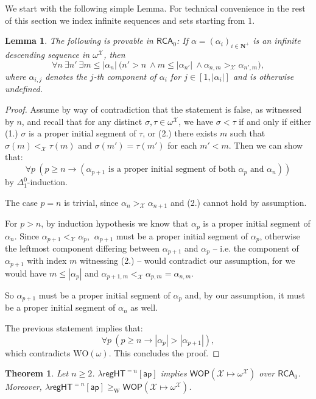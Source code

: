 \documentclass[a4paper,11pt]{article}
\newtheorem{theorem}{Theorem}
\newtheorem{lemma}{Lemma}
\newcommand\Nat{\mathbf{N}}
\newcommand\RCA{\mathsf{RCA}}
\newcommand\regHT{\mathsf{regHT}}
\newcommand\W{\mathrm{W}}
\newcommand\ap{\mathsf{ap}}
\newcommand\WO{\mathrm{WO}}
\newcommand\ordX{\mathcal{X}}
\newcommand\WOP{\mathsf{WOP}}
\begin{document}
We start with the following simple Lemma. For technical convenience in the rest of this section we index infinite sequences and sets starting from $1$.

\begin{lemma}\label{claim1} The following is provable in $\RCA_0$: If $\alpha=(\alpha_i)_{i\in\Nat^+}$ is an infinite descending sequence in $\omega^\ordX$, then
$$\forall n\ \exists n'\ \exists m\leq |\alpha_n| \ \big(n'>n \ \land m \leq |\alpha_{n'}| \ \land \alpha_{n,m} >_{\ordX} \alpha_{n',m}\big),$$
where $\alpha_{i,j}$ denotes the $j$-th component of $\alpha_i$ for $j \in [1,|\alpha_i|]$ and is otherwise undefined.
\end{lemma}

\begin{proof}

Assume by way of contradiction that the statement is false, as witnessed by $n$, and recall that for any distinct $\sigma, \tau \in \omega^\ordX$, we have $\sigma < \tau$ if and only if either (1.) $\sigma$ is a proper initial segment of $\tau$, or (2.) there exists $m$ such that $\sigma(m) <_\ordX \tau(m)$ and  $\sigma(m') = \tau(m')$ for each $m'<m$. Then we can show that:
$$
\forall p\ (p \geq n \rightarrow (\alpha_{p+1} \text{ is a proper initial segment of both } \alpha_p \text{ and } \alpha_n))
$$
by $\Delta^0_1$-induction.

The case $p=n$ is trivial, since $\alpha_n >_{\ordX} \alpha_{n+1}$ and (2.) cannot hold by assumption.

For $p>n$, by induction hypothesis we know that $\alpha_p$ is a proper initial segment of $\alpha_n$. 
Since $\alpha_{p+1} <_{\ordX} \alpha_p$, $\ \alpha_{p+1}$ must be a proper initial segment of $\alpha_p$, otherwise the leftmost component differing between $\alpha_{p+1}$ and $\alpha_p$ -- i.e. the component of $\alpha_{p+1}$ with index $m$ witnessing (2.) -- would contradict our assumption, for we would have $m\leq |\alpha_p|$ and $\alpha_{p+1,m} <_\ordX \alpha_{p,m} = \alpha_{n,m}$.

So  $\alpha_{p+1}$ must be a proper initial segment of $\alpha_p$ and, by our assumption, it must be a proper initial segment of $\alpha_n$ as well.

The previous statement implies that:
$$
\forall p\ (p \geq n \rightarrow |\alpha_p| > |\alpha_{p+1}|),
$$
which contradicts $\WO(\omega)$. This concludes the proof.
\end{proof}

\begin{theorem}\label{thm:reghtwop}
Let $n \geq 2$. $\lambda\regHT^{= n}[\ap]$ implies $\WOP(\ordX\mapsto \omega^\ordX)$ over $\RCA_0$.
Moreover, $\lambda\regHT^{=n}[\ap]\geq_\W \WOP(\ordX\mapsto \omega^\ordX)$.
\end{theorem}
\end{document}
